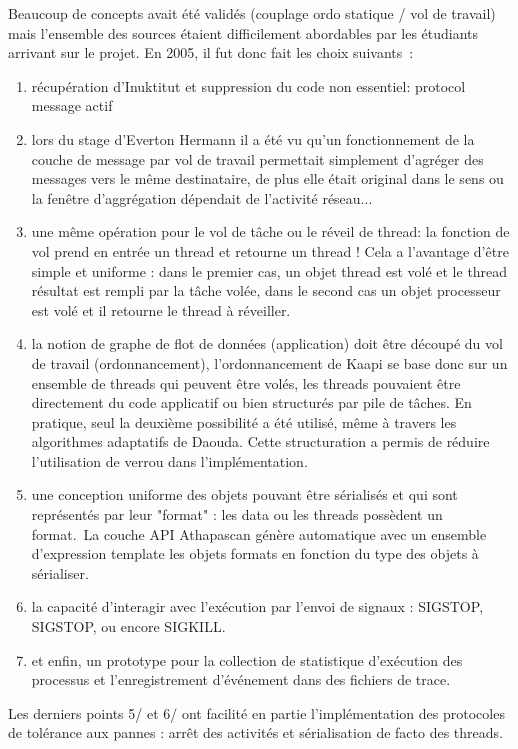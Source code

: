 \documentclass{report}
\begin{document}
Beaucoup de concepts avait été validés (couplage ordo statique / vol de travail) mais l'ensemble des sources étaient difficilement abordables par les étudiants arrivant sur le projet. En 2005, il fut donc fait les choix suivants~:
\begin{enumerate}
\item récupération d'Inuktitut et suppression du code non essentiel: protocol message actif
\item lors du stage d'Everton Hermann il a été vu qu'un fonctionnement de la couche de message par vol de travail permettait simplement d'agréger des messages vers le même destinataire, de plus elle était original dans le sens ou la fenêtre d'aggrégation dépendait de l'activité réseau...
\item une même opération pour le vol de tâche ou le réveil de thread: la fonction de vol prend en entrée un thread et retourne un thread ! Cela a l'avantage d'être simple et uniforme : dans le premier cas, un objet thread est volé et le thread résultat est rempli par la tâche volée, dans le second cas un objet processeur est volé et il retourne le thread à réveiller. 
\item la notion de graphe de flot de données (application) doit être découpé du vol de travail (ordonnancement), l'ordonnancement de Kaapi se base donc sur un ensemble de threads qui peuvent être volés, les threads pouvaient être directement du code applicatif ou bien structurés par pile de tâches. En pratique, seul la deuxième possibilité a été utilisé, même à travers les algorithmes adaptatifs de Daouda. Cette structuration a permis de réduire l'utilisation de verrou dans l'implémentation.
\item une conception uniforme des objets pouvant être sérialisés et qui sont représentés par leur "format" : les data ou les threads possèdent un format. La couche API Athapascan génère automatique avec un ensemble d'expression template les objets formats en fonction du type des objets à sérialiser.
\item la capacité d'interagir avec l'exécution par l'envoi de signaux : SIGSTOP, SIGSTOP, ou encore SIGKILL.
\item et enfin, un prototype pour la collection de statistique d'exécution des processus et l'enregistrement d'événement dans des fichiers de trace. 
\end{enumerate}

Les derniers points 5/ et 6/ ont facilité en partie l'implémentation des protocoles de tolérance aux pannes : arrêt des activités et sérialisation de facto des threads.
\end{document}
